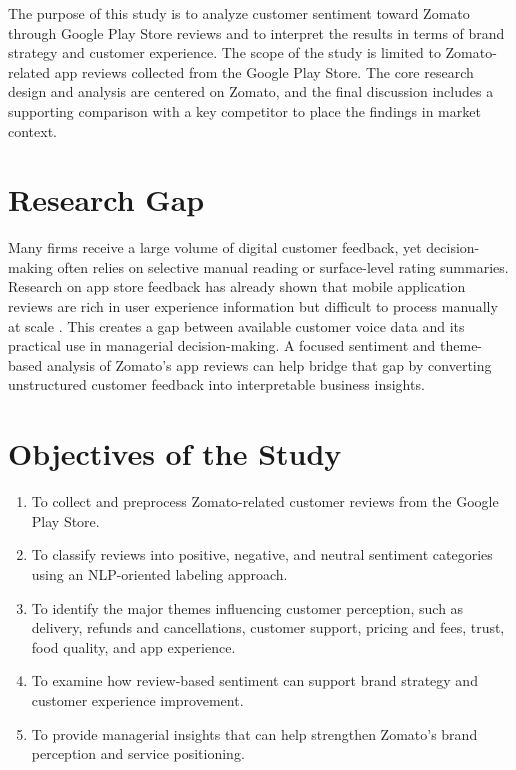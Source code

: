 The purpose of this study is to analyze customer sentiment toward Zomato through Google Play Store reviews and to interpret the results in terms of brand strategy and customer experience. The scope of the study is limited to Zomato-related app reviews collected from the Google Play Store. The core research design and analysis are centered on Zomato, and the final discussion includes a supporting comparison with a key competitor to place the findings in market context.

\section{Research Gap}

Many firms receive a large volume of digital customer feedback, yet decision-making often relies on selective manual reading or surface-level rating summaries. Research on app store feedback has already shown that mobile application reviews are rich in user experience information but difficult to process manually at scale \cite{pagano2013,guzman2017,martin2017}. This creates a gap between available customer voice data and its practical use in managerial decision-making. A focused sentiment and theme-based analysis of Zomato's app reviews can help bridge that gap by converting unstructured customer feedback into interpretable business insights.

\section{Objectives of the Study}

\begin{enumerate}[label=\arabic*.]
    \item To collect and preprocess Zomato-related customer reviews from the Google Play Store.
    \item To classify reviews into positive, negative, and neutral sentiment categories using an NLP-oriented labeling approach.
    \item To identify the major themes influencing customer perception, such as delivery, refunds and cancellations, customer support, pricing and fees, trust, food quality, and app experience.
    \item To examine how review-based sentiment can support brand strategy and customer experience improvement.
    \item To provide managerial insights that can help strengthen Zomato's brand perception and service positioning.
\end{enumerate}

